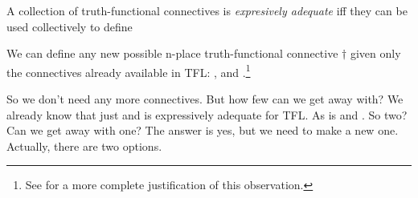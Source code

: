 \begin{definition}
  A collection of truth-functional connectives is \emph{expresively adequate}
  iff they can be used collectively to define
\end{definition}


\begin{observation}
  We can define any new possible n-place truth-functional connective $\dagger$
  given only the connectives already available in TFL: \eand, \eor and
  \enot.\footnote{See \cite[][pp. 115-117]{Smi20} for a more complete
  justification of this observation.}
\end{observation}

So we don't need any more connectives. But how few can we get away with? We
already know that just \enot and \eor is expressively adequate for TFL. As is
\enot and \eand. So two? Can we get away with one? The answer is yes, but we
need to make a new one. Actually, there are two options.

